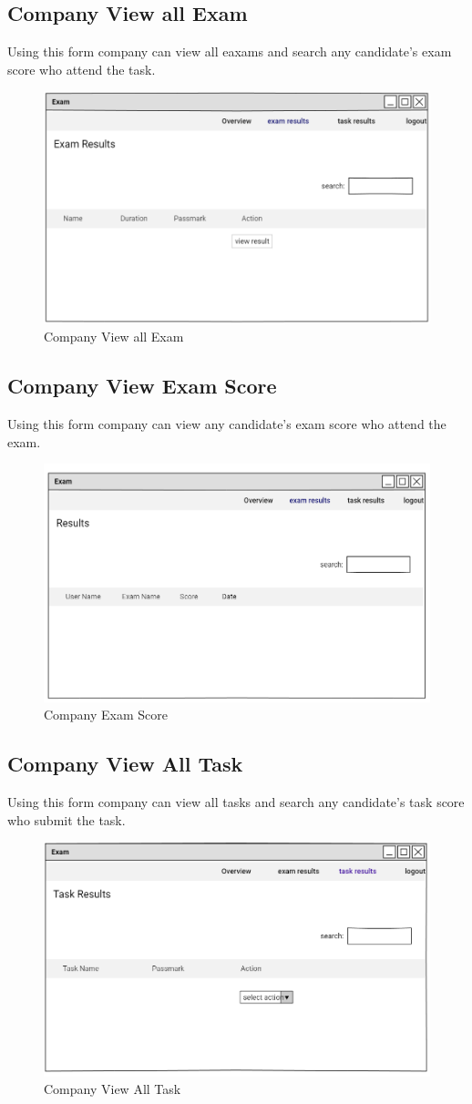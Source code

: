 \documentclass[a4paper,12pt]{report}
\begin{document}
\subsection {Company View all Exam }
Using this form company can view all eaxams and search any candidate's exam score who attend the task.
\begin{figure}[bph]
	\centering
	\includegraphics[width=.6\linewidth]{img/company/ce1}
	\caption{Company View all Exam}
\end{figure}
\pagebreak

\subsection {Company View Exam  Score}
Using this form company can view any candidate's exam score who attend the exam.
\begin{figure}[bph]
	\centering
	\includegraphics[width=.6\linewidth]{img/company/cmpnyviewsinlexmrslt}
	\caption{Company  Exam  Score}
\end{figure}
\subsection {Company View All Task }
Using this form company can view all tasks and search any candidate's task score who submit the task.
\begin{figure}[bph]
	\centering
	\includegraphics[width=.7\linewidth]{img/company/ct1}
	\caption{Company View All Task }
\end{figure}
\pagebreak
\end{document}
